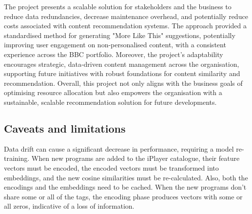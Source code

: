 The project presents a scalable solution for stakeholders and the business to reduce data redundancies,
decrease maintenance overhead, and potentially reduce costs associated with content recommendation systems.
The approach provided a standardised method for generating "More Like This" suggestions,
potentially improving user engagement on non-personalised content,
with a consistent experience across the BBC portfolio.
Moreover, the project's adaptability encourages strategic, data-driven content management across the organisation,
supporting future initiatives with robust foundations for content similarity and recommendation.
Overall, this project not only aligns with the business goals of optimising resource allocation but also empowers the organisation with a sustainable,
scalable recommendation solution for future developments.

\subsection{Caveats and limitations}

Data drift can cause a significant decrease in performance,
requiring a model re-training.
When new programs are added to the iPlayer catalogue,
their feature vectors must be encoded,
the encoded vectors must be transformed into embeddings,
and the new cosine similarities must be re-calculated.
Also, both the encodings and the embeddings need to be cached.
When the new programs don't share some or all of the tags,
the encoding phase produces vectors with some or all zeros,
indicative of a loss of information.
